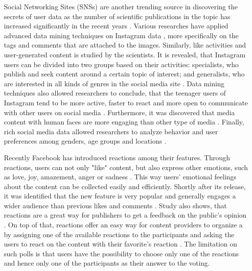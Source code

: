 Social Networking Sites (SNSs) are another trending source in discovering the secrets of user data as the number of scientific publications in the topic has increased significantly in the recent years \cite{waheed2017investigation}. Various researches have applied advanced data mining techniques on Instagram data \cite{jang2015noreciprocity, bakhshi2014faces, hu2014we, jang2016teensengagemorewithfewerphotos, han2016teensarefrommars}, more specifically on the tags and comments that are attached to the images. Similarly, like activities and user-generated content is studied by the scientists. It is revealed, that Instagram users can be divided into two groups based on their activities: specialists, who publish and seek content around a certain topic of interest; and generalists, who are interested in all kinds of genres in the social media site \cite{jang2015noreciprocity}. Data mining techniques also allowed researchers to conclude, that the teenager users of Instagram tend to be more active, faster to react and more open to communicate with other users on social media \cite{jang2016teensengagemorewithfewerphotos, han2016teensarefrommars}. Furthermore, it was discovered that media content with human faces are more engaging than other type of media \cite{bakhshi2014faces}. Finally, rich social media data allowed researchers to analyze behavior and user preferences among genders, age groups and locations \cite{farseev2015harvestingmultiplesources}.

Recently Facebook has introduced reactions among their features. Through reactions, users can not only "like" content, but also express other emotions, such as love, joy, amazement, anger or sadness \cite{shouldfacebookusereactions, howarenewspublishersreactingonfacebook}. This way users' emotional feelings about the content can be collected easily and efficiently. Shortly after its release, it was identified that the new feature is very popular and generally engages a wider audience than previous likes and comments \cite{shouldfacebookusereactions}. Study also shows, that reactions are a great way for publishers to get a feedback on the public's opinion \cite{howarenewspublishersreactingonfacebook}. On top of that, reactions offer an easy way for content providers to organize a by assigning one of the available reactions to the participants and asking the users to react on the content with their favorite's reaction \cite{shouldfacebookusereactions}. The limitation on such polls is that users have the possibility to choose only one of the reactions and hence only one of the participants as their answer to the voting.  

